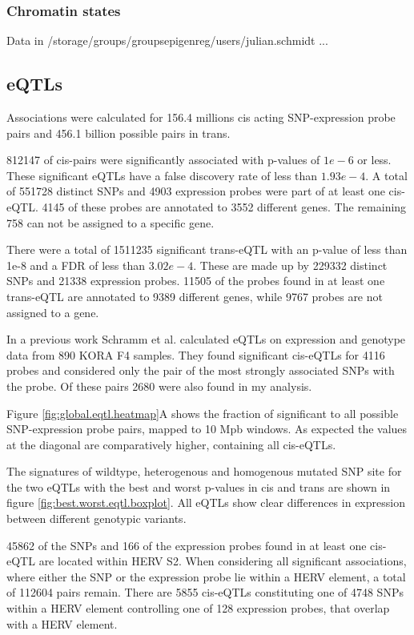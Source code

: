 \documentclass[a4paper,12pt]{article}
\begin{document}
\subsubsection{Chromatin states}
Data in /storage/groups/groups\textunderscore epigenreg/users/julian.schmidt ...

\subsection{eQTLs}
Associations were calculated for 156.4 millions cis acting SNP-expression probe pairs and 456.1 billion possible pairs in trans. 

812147 of cis-pairs were significantly associated with p-values of $1e-6$ or less. These significant eQTLs have a false discovery rate of less than $1.93e-4$. A total of 551728 distinct SNPs and 4903 expression probes were part of at least one cis-eQTL. 4145 of these probes are annotated to 3552 different genes. The remaining 
758 can not be assigned to a specific gene.

There were a total of 1511235 significant trans-eQTL with an p-value of less than 1e-8 and a FDR of less than $3.02e-4$. These are made up by 229332 distinct SNPs and 21338 expression probes. 11505 of the probes found in at least one trans-eQTL are annotated to 9389 different genes, while 9767 probes are not assigned to a gene.

In a previous work Schramm et al. \cite{} calculated eQTLs on expression and genotype data from 890 KORA F4 samples. They found significant cis-eQTLs for 4116 probes and considered only the pair of the most strongly associated SNPs with the probe. Of these pairs 2680 were also found in my analysis. 

Figure \ref{fig:global.eqtl.heatmap}A shows the fraction of significant to all possible  SNP-expression probe pairs, mapped to 10 Mpb windows. As expected the values at the diagonal are comparatively higher, containing all cis-eQTLs. 

The signatures of wildtype, heterogenous and homogenous mutated SNP site for the two eQTLs with the best and worst p-values in cis and trans are shown in figure \ref{fig:best.worst.eqtl.boxplot}. All eQTLs show clear differences in expression between different genotypic variants. 

45862 of the SNPs and 166 of the expression probes found in at least one cis-eQTL are located within HERV S2. When considering all significant associations, where either the SNP or the expression probe lie within a HERV element, a total of 112604 pairs remain. There are 5855 cis-eQTLs constituting one of 4748 SNPs within a HERV element controlling one of 128 expression probes, that overlap with a HERV element. 
\end{document}
